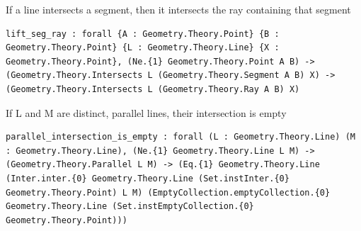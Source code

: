 \begin{theorem}
  \label{Geometry.Theory.Intersection.lift_seg_ray}
  \leanok
  If a line intersects a segment, then it intersects the ray containing that segment 
\begin{verbatim}lift_seg_ray : forall {A : Geometry.Theory.Point} {B : Geometry.Theory.Point} {L : Geometry.Theory.Line} {X : Geometry.Theory.Point}, (Ne.{1} Geometry.Theory.Point A B) -> (Geometry.Theory.Intersects L (Geometry.Theory.Segment A B) X) -> (Geometry.Theory.Intersects L (Geometry.Theory.Ray A B) X)\end{verbatim}
\end{theorem}

\begin{theorem}
  \label{Geometry.Theory.Intersection.parallel_intersection_is_empty}
  \leanok
  If L and M are distinct, parallel lines, their intersection is empty 
\begin{verbatim}parallel_intersection_is_empty : forall (L : Geometry.Theory.Line) (M : Geometry.Theory.Line), (Ne.{1} Geometry.Theory.Line L M) -> (Geometry.Theory.Parallel L M) -> (Eq.{1} Geometry.Theory.Line (Inter.inter.{0} Geometry.Theory.Line (Set.instInter.{0} Geometry.Theory.Point) L M) (EmptyCollection.emptyCollection.{0} Geometry.Theory.Line (Set.instEmptyCollection.{0} Geometry.Theory.Point)))\end{verbatim}
\end{theorem}


